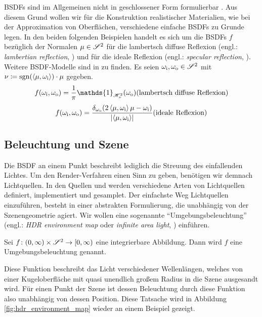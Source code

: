 		BSDFs sind im Allgemeinen nicht in geschlossener Form formulierbar \cite[S.~507~f]{pbrt3}.
		Aus diesem Grund wollen wir für die Konstruktion realistischer Materialien, wie bei der Approximation von Oberflächen, verschiedene einfache BSDFs zu Grunde legen.
		In den beiden folgenden Beispielen handelt es sich um die BSDFs $f$ bezüglich der Normalen $\mu\in\mathscr{S}^{2}$ für die lambertsch diffuse Reflexion (engl.: \textit{lambertian reflection}, \cite[S.~531~f]{pbrt3}) und für die ideale Reflexion (engl.: \textit{specular reflection}, \cite[S.~144~f]{veach-thesis}).
		Weitere BSDF-Modelle sind in \cite{pbrt3,veach-thesis,radiosity} zu finden.
		Es seien $\omega_{\mathrm{i}},\omega_{\mathrm{o}}\in\mathscr{S}^{2}$ mit $\nu\coloneqq\operatorname{sgn}(\left\langle \mu,\omega_{\mathrm{i}} \right\rangle)\cdot\mu$ gegeben.
		\[
			f(\omega_\m{i},\omega_\m{o}) = \frac{1}{\pi}\mathds{1}_{\shs{\nu}}(\omega_\m{o}) \hfill \text{(lambertsch diffuse Reflexion)}
		\]
		\[
			f(\omega_\m{i},\omega_\m{o}) = \frac{\delta_{\omega_\m{o}}(2\dotp{\mu}{\omega_\m{i}}\mu - \omega_\m{i})}{\abs{\dotp{\mu}{\omega_\m{i}}}} \hfill \text{(ideale Reflexion)}
		\]


	\subsection{Beleuchtung und Szene} %
	\label{sub:beleuchtung_und_szene}

		Die BSDF an einem Punkt beschreibt lediglich die Streuung des einfallenden Lichtes.
		Um den Render-Verfahren einen Sinn zu geben, benötigen wir demnach Lichtquellen.
		In den Quellen \cite[S.~707~ff]{pbrt3} und \cite{course-photon-map} werden verschiedene Arten von Lichtquellen definiert, implementiert und gesamplet.
		Der einfachste Weg Lichtquellen einzuführen, besteht in einer abstrakten Formulierung, die unabhängig von der Szenengeometrie agiert.
		Wir wollen eine sogenannte \enquote{Umgebungsbeleuchtung} (engl.: \textit{HDR environment map} oder \textit{infinite area light}, \cite[S.~737~f]{pbrt3}) einführen.
		\begin{definition}[Umgebungsbeleuchtung]
			Sei $f\colon(0,\infty)\times\mathscr{S}^{2}\to[0,\infty)$ eine integrierbare Abbildung. Dann wird $f$ eine Umgebungsbeleuchtung genannt.
		\end{definition}

		Diese Funktion beschreibt das Licht verschiedener Wellenlängen, welches von einer Kugeloberfläche mit quasi unendlich großem Radius in die Szene ausgesandt wird.
		Für einen Punkt der Szene ist dessen Beleuchtung durch diese Funktion also unabhängig von dessen Position.
		Diese Tatsache wird in Abbildung \ref{fig:hdr_environment_map} wieder an einem Beispiel gezeigt.

